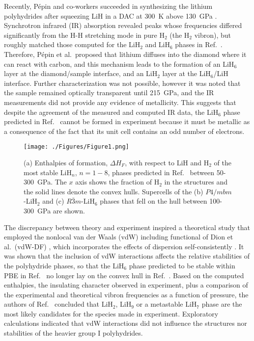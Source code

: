 \documentclass[12pt,letterpaper,oneside]{article}
\begin{document}
Recently, P\'epin and co-workers succeeded in synthesizing the lithium polyhydrides after squeezing  LiH in a DAC at 300~K above 130~GPa \cite{Pepin:2015a}. Synchrotron infrared (IR) absorption revealed peaks whose frequencies differed significantly from the H-H stretching mode in pure H$_2$ (the H$_2$ vibron), but roughly matched those computed for the LiH$_2$ and LiH$_6$ phases in Ref.\ \cite{Zurek:2009c}. Therefore, P\'epin et al.\ proposed that lithium diffuses into the diamond where it can react with carbon, and this mechanism leads to the formation of an  LiH$_6$ layer at the diamond/sample interface, and an LiH$_2$ layer at the LiH$_6$/LiH interface. Further characterization was not possible, however it was noted that the  sample remained optically transparent until 215~GPa, and the IR measurements did not provide any evidence of metallicity. This suggests that despite the agreement of the measured and computed IR data, the LiH$_6$ phase predicted in Ref.\ \cite{Zurek:2009c} cannot be formed in experiment because it must be metallic as a consequence of the fact that its unit cell contains an odd number of electrons. 
%
\begin{figure}[h!]
\begin{center}
\texttt{[image: ./Figures/Figure1.png]}
\end{center}
\caption{(a) Enthalpies of formation, $\Delta H_F$,  with respect to LiH and H$_2$ of the most stable LiH$_n$, $n=1-8$, phases predicted in Ref.\ \cite{Zurek:2009c} between 50-300~GPa. The $x$ axis shows the fraction of H$_2$ in the structures and the solid lines denote the convex hulls. Supercells of the (b) $P4/mbm$-LiH$_2$ and (c) $R\bar{3}m$-LiH$_6$ phases that fell on the hull between 100-300~GPa are shown.}
\label{fig:Group1}
\end{figure}

The discrepancy between theory and experiment inspired a theoretical study that employed the nonlocal van der Waals (vdW) including functional of Dion et al.\ (vdW-DF) \cite{Dion:2004}, which incorporates the effects of dispersion self-consistently \cite{Chen:2017a}. It was shown that the inclusion of vdW interactions affects the relative stabilities of the polyhydride phases, so that the LiH$_6$ phase predicted to be stable within PBE in Ref.\ \cite{Zurek:2009c} no longer lay on the convex hull in Ref.\ \cite{Chen:2017a}.  Based on the computed enthalpies, the insulating character observed in experiment, plus a comparison of the experimental and theoretical vibron frequencies as a function of pressure, the authors of Ref.\ \cite{Chen:2017a} concluded that LiH$_2$, LiH$_9$ or a metastable LiH$_7$ phase are the most likely candidates for the species made in experiment. Exploratory calculations indicated that vdW interactions did not influence the structures nor stabilities of the heavier group I polyhydrides.
\end{document}
